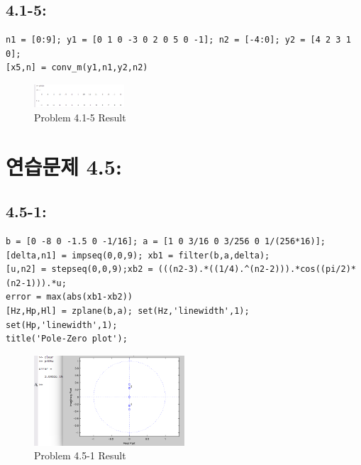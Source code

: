 \documentclass[11pt
  , a4paper
  , article
  , oneside
]{memoir}
\begin{document}
\section{4.1-5: }
\begin{lstlisting}[style=termstyle]
n1 = [0:9]; y1 = [0 1 0 -3 0 2 0 5 0 -1]; n2 = [-4:0]; y2 = [4 2 3 1 0];
[x5,n] = conv_m(y1,n1,y2,n2)
\end{lstlisting}

\begin{figure}[h!]
	\centering
	\includegraphics[width=0.3\textwidth,height=0.15\textwidth]{./images/p401-5.png}
	\caption{Problem 4.1-5 Result}
	\label{fig:Problem 4.1-5 Result}
\end{figure}

\clearpage

\chapter{연습문제 4.5: }
\section{4.5-1: }
\begin{lstlisting}[style=termstyle]
b = [0 -8 0 -1.5 0 -1/16]; a = [1 0 3/16 0 3/256 0 1/(256*16)];
[delta,n1] = impseq(0,0,9); xb1 = filter(b,a,delta);
[u,n2] = stepseq(0,0,9);xb2 = (((n2-3).*((1/4).^(n2-2))).*cos((pi/2)*(n2-1))).*u;
error = max(abs(xb1-xb2))
[Hz,Hp,Hl] = zplane(b,a); set(Hz,'linewidth',1); set(Hp,'linewidth',1);
title('Pole-Zero plot');
\end{lstlisting}

\begin{figure}[h!]
	\centering
	\includegraphics[width=0.5\textwidth,height=0.25\textwidth]{./images/p405-1.png}
	\caption{Problem 4.5-1 Result}
	\label{fig:Problem 4.5-1 Result}
\end{figure}
\end{document}

